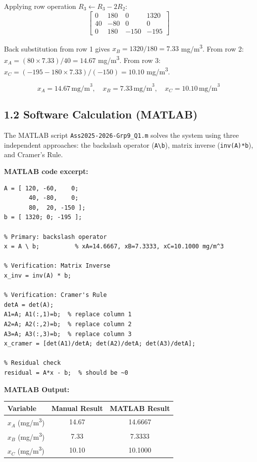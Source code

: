 \documentclass[12pt,a4paper]{article}
\begin{document}
Applying row operation $R_3 \leftarrow R_3 - 2R_2$:
\[
\left[\begin{array}{ccc|c}
0 & 180 & 0 & 1320\\
40 & -80 & 0 & 0\\
0 & 180 & -150 & -195
\end{array}\right]
\]

Back substitution from row 1 gives $x_B = 1320/180 = 7.33$ mg/m\textsuperscript{3}. From row 2: $x_A = (80 \times 7.33)/40 = 14.67$ mg/m\textsuperscript{3}. From row 3: $x_C = (-195 - 180\times7.33)/(-150) = 10.10$ mg/m\textsuperscript{3}.

\[
\boxed{x_A = 14.67\,\text{mg/m}^3,\quad x_B = 7.33\,\text{mg/m}^3,\quad x_C = 10.10\,\text{mg/m}^3}
\]

\subsection{1.2 Software Calculation (MATLAB)}

The MATLAB script \texttt{Ass2025-2026-Grp9\_Q1.m} solves the system using three independent
approaches: the backslash operator (\texttt{A\textbackslash b}), matrix inverse (\texttt{inv(A)*b}), and Cramer's Rule.

\textbf{MATLAB code excerpt:}
\begin{lstlisting}[style=matlabstyle, caption={Q1 -- Solving 3-reactor system in MATLAB}]
A = [ 120, -60,    0;
       40, -80,    0;
       80,  20, -150 ];
b = [ 1320; 0; -195 ];

% Primary: backslash operator
x = A \ b;          % xA=14.6667, xB=7.3333, xC=10.1000 mg/m^3

% Verification: Matrix Inverse
x_inv = inv(A) * b;

% Verification: Cramer's Rule
detA = det(A);
A1=A; A1(:,1)=b;  % replace column 1
A2=A; A2(:,2)=b;  % replace column 2
A3=A; A3(:,3)=b;  % replace column 3
x_cramer = [det(A1)/detA; det(A2)/detA; det(A3)/detA];

% Residual check
residual = A*x - b;  % should be ~0
\end{lstlisting}

\textbf{MATLAB Output:}

\begin{center}
\begin{tabular}{lcc}
  \toprule
  \textbf{Variable} & \textbf{Manual Result} & \textbf{MATLAB Result} \\
  \midrule
  $x_A$ (mg/m\textsuperscript{3}) & 14.67 & 14.6667 \\
  $x_B$ (mg/m\textsuperscript{3}) & 7.33  & 7.3333  \\
  $x_C$ (mg/m\textsuperscript{3}) & 10.10 & 10.1000 \\
  \bottomrule
\end{tabular}
\end{center}
\end{document}
